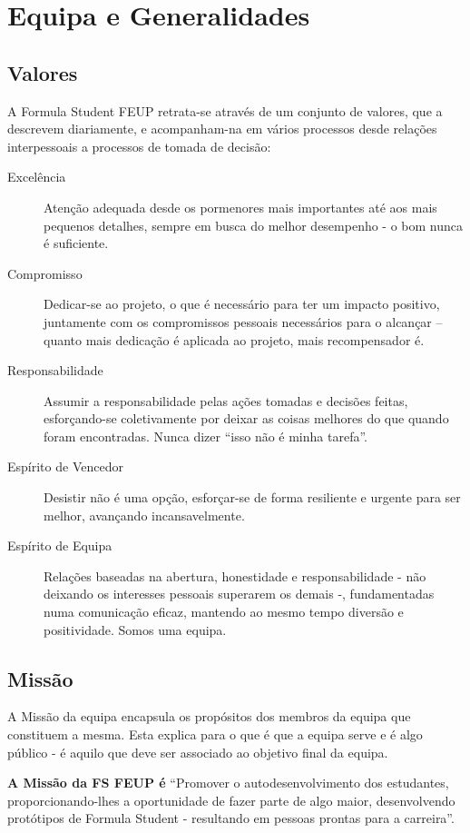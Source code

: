 \chapter{Equipa e Generalidades}

\section{Valores}
A Formula Student FEUP retrata-se através de um conjunto de valores, que a descrevem diariamente, e acompanham-na em vários processos desde relações interpessoais a processos de tomada de decisão:

\begin{description}
  \item[Excelência] Atenção adequada desde os pormenores mais importantes até aos mais pequenos detalhes, sempre em busca do melhor desempenho - o bom nunca é suficiente.
  \item[Compromisso] Dedicar-se ao projeto, o que é necessário para ter um impacto positivo, juntamente com os compromissos pessoais necessários para o alcançar -- quanto mais dedicação é aplicada ao projeto, mais recompensador é.
  \item[Responsabilidade] Assumir a responsabilidade pelas ações tomadas e decisões feitas, esforçando-se coletivamente por deixar as coisas melhores do que quando foram encontradas. Nunca dizer ``isso não é minha tarefa''.
  \item[Espírito de Vencedor] Desistir não é uma opção, esforçar-se de forma resiliente e urgente para ser melhor, avançando incansavelmente.
  \item[Espírito de Equipa] Relações baseadas na abertura, honestidade e responsabilidade - não deixando os interesses pessoais superarem os demais -, fundamentadas numa comunicação eficaz, mantendo ao mesmo tempo diversão e positividade. Somos uma equipa.
\end{description}

\section{Missão}
A Missão da equipa encapsula os propósitos dos membros da equipa que constituem a mesma. Esta explica para o que é que a equipa serve e é algo público - é aquilo que deve ser associado ao objetivo final da equipa.

\textbf{A Missão da FS FEUP é} ``Promover o autodesenvolvimento dos estudantes, proporcionando-lhes a oportunidade de fazer parte de algo maior, desenvolvendo protótipos de Formula Student - resultando em pessoas prontas para a carreira''.

